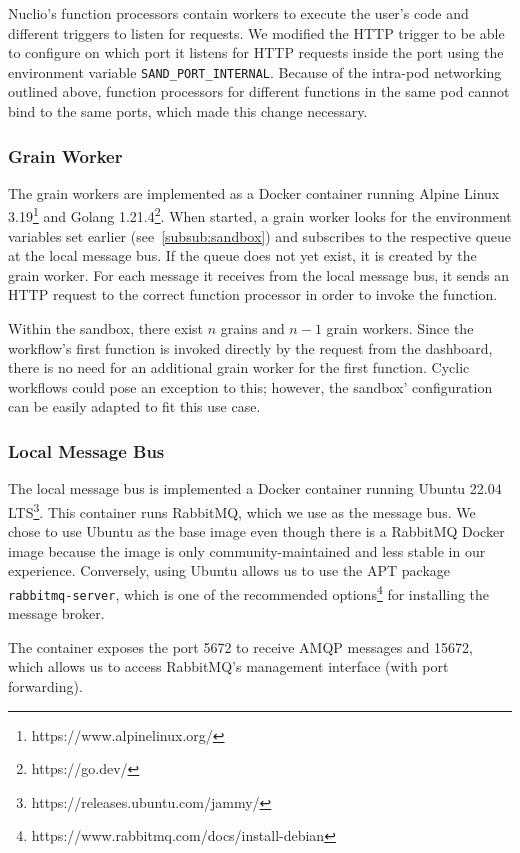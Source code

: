 Nuclio's function processors contain workers to execute the user's code and different triggers to listen for requests.
We modified the HTTP trigger to be able to configure on which port it listens for HTTP requests inside the port using the environment variable \texttt{SAND\_PORT\_INTERNAL}.
Because of the intra-pod networking outlined above, function processors for different functions in the same pod cannot bind to the same ports, which made this change necessary.


\subsubsection{Grain Worker}

The grain workers are implemented as a Docker container running Alpine Linux 3.19\footnote{https://www.alpinelinux.org/} and Golang 1.21.4\footnote{https://go.dev/}.
When started, a grain worker looks for the environment variables set earlier (see~\ref{subsub:sandbox}) and subscribes to the respective queue at the local message bus.
If the queue does not yet exist, it is created by the grain worker.
For each message it receives from the local message bus, it sends an HTTP request to the correct function processor in order to invoke the function.

Within the sandbox, there exist $n$ grains and $n-1$ grain workers.
Since the workflow's first function is invoked directly by the request from the dashboard, there is no need for an additional grain worker for the first function.
Cyclic workflows could pose an exception to this; however, the sandbox' configuration can be easily adapted to fit this use case.

\subsubsection{Local Message Bus}

The local message bus is implemented a Docker container running Ubuntu 22.04 LTS\footnote{https://releases.ubuntu.com/jammy/}.
This container runs RabbitMQ, which we use as the message bus. 
We chose to use Ubuntu as the base image even though there is a RabbitMQ Docker image because the image is only community-maintained and less stable in our experience.
Conversely, using Ubuntu allows us to use the APT package \texttt{rabbitmq-server}, which is one of the recommended options\footnote{https://www.rabbitmq.com/docs/install-debian} for installing the message broker.

The container exposes the port 5672 to receive AMQP messages and 15672, which allows us to access RabbitMQ's management interface (with port forwarding). 

